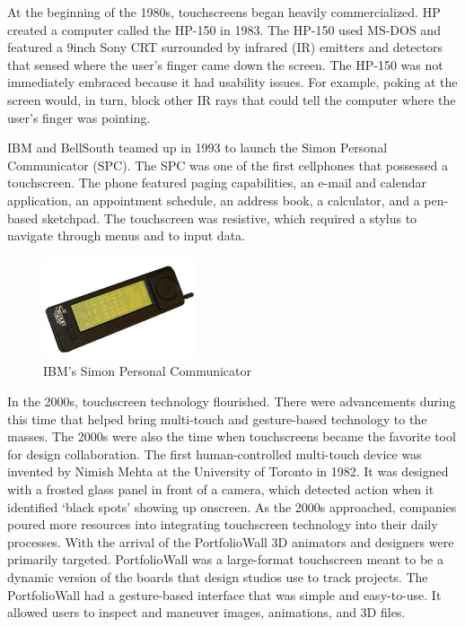\documentclass{article}
\begin{document}
At the beginning of the 1980s, touchscreens began heavily commercialized. HP created a computer called the HP-150 in 1983. The HP-150 used MS-DOS and featured a 9inch Sony CRT surrounded by infrared (IR) emitters and detectors that sensed where the user’s finger came down the screen. The HP-150 was not immediately embraced because it had usability issues. For example, poking at the screen would, in turn, block other IR rays that could tell the computer where the user’s finger was pointing. 

IBM and BellSouth teamed up in 1993 to launch the Simon Personal Communicator (SPC). The SPC was one of the first cellphones that possessed a touchscreen. The phone featured paging capabilities, an e-mail and calendar application, an appointment schedule, an address book, a calculator, and a pen-based sketchpad. The touchscreen was resistive, which required a stylus to navigate through menus and to input data.
\cite{ref8}

\begin{figure}[!ht]
    \caption{IBM's Simon Personal Communicator}
    \label{image:SPC}
    \centering
    \includegraphics[width=0.4\textwidth]{pics/IBM_Simon.jpeg}
\end{figure}

In the 2000s, touchscreen technology flourished. There were advancements during this time that helped bring multi-touch and gesture-based technology to the masses. The 2000s were also the time when touchscreens became the favorite tool for design collaboration. The first human-controlled multi-touch device was invented by Nimish Mehta at the University of Toronto in 1982. It was designed with a frosted glass panel in front of a camera, which detected action when it identified ‘black spots’ showing up onscreen.
As the 2000s approached, companies poured more resources into integrating touchscreen technology into their daily processes. With the arrival of the PortfolioWall 3D animators and designers were primarily targeted. PortfolioWall was a large-format touchscreen meant to be a dynamic version of the boards that design studios use to track projects.  The PortfolioWall had a gesture-based interface that was simple and easy-to-use. It allowed users to inspect and maneuver images, animations, and 3D files. 
\cite{ref8}
\end{document}

